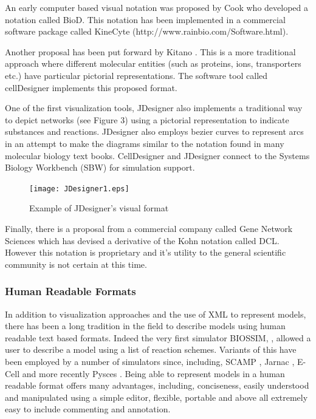 \documentclass[12pt]{article}
\begin{document}
{An early computer based visual notation was proposed by Cook \cite{Cook2001} who developed
a notation called BioD. This notation has been implemented in a commercial software package
called KineCyte \linebreak (http://www.rainbio.com/Software.html).

Another proposal has been put forward by Kitano \cite{Kitano2003}. This is a more traditional
approach where different molecular entities (such as proteins, ions, transporters etc.) have particular pictorial representations. The software tool called cellDesigner \cite{CellDesigner2003} implements this proposed format.

One of the first visualization tools, JDesigner \cite{Sauro:Omics} also implements a
traditional way to depict networks (see Figure 3) using a pictorial representation to indicate substances and reactions. JDesigner also employs bezier curves to represent arcs in an attempt to make the diagrams similar to the notation found
in many molecular biology text books. CellDesigner and JDesigner connect to the Systems Biology Workbench (SBW) for simulation support.

\begin{figure}[h] \label{Figure:JDesigner}
\begin{center}
  \texttt{[image: JDesigner1.eps]}
\end{center}
\caption{Example of JDesigner's visual format}
\end{figure}


Finally, there is a proposal from a commercial company called Gene Network Sciences which has
devised a derivative of the Kohn notation called DCL. However this notation is proprietary and it's utility to the general scientific community is not certain at this time.

\subsubsection{Human Readable Formats}

In addition to visualization approaches and the use of XML to represent models, there has been a long tradition in the field to describe models using human readable text based formats. Indeed the very first simulator BIOSSIM, \cite{Ga68}, allowed a user to describe a model using a list of reaction schemes. Variants of this have been employed by a number of simulators since, including, SCAMP \cite{SauroF91}, Jarnac \cite{sauro:2000}, E-Cell \cite{ECELL} and more recently Pysces \cite{Pysces2005}. Being able to represent models in a human readable format offers many advantages, including, conciseness, easily understood and manipulated using a simple editor, flexible, portable and above all extremely easy to include commenting and annotation.

}
\end{document}
